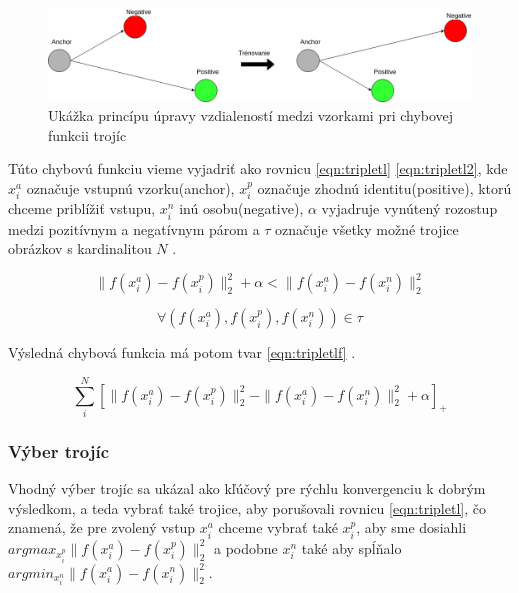 \begin{figure}[H]
	\centering
	\includegraphics[width=0.75\linewidth]{img/triplet}
	\caption{Ukážka princípu úpravy vzdialeností medzi vzorkami pri chybovej funkcii trojíc}
	\label{fig:triplet}
\end{figure}

Túto chybovú funkciu vieme vyjadriť ako rovnicu \eqref{eqn:tripletl} \eqref{eqn:tripletl2}, kde $x_{i}^a$ označuje vstupnú vzorku(anchor), $x_{i}^p$ označuje zhodnú identitu(positive), ktorú chceme priblížiť vstupu,
$x_{i}^n$ inú osobu(negative), $\alpha$ vyjadruje vynútený rozostup medzi pozitívnym a negatívnym párom a $\tau$ označuje všetky možné trojice obrázkov s kardinalitou $ N $ \cite{schroff2015facenet}.

\begin{equation}\label{eqn:tripletl}
\parallel f(x_{i}^a) - f(x_{i}^p) \parallel_{2}^2 + \alpha <
\parallel f(x_{i}^a) - f(x_{i}^n)\parallel_{2}^2
\end{equation}

\begin{equation}\label{eqn:tripletl2}
\forall(f(x_{i}^a), f(x_{i}^p), f(x_{i}^n)) \in \tau
\end{equation}

\indent Výsledná chybová funkcia má potom tvar \eqref{eqn:tripletlf} \cite{schroff2015facenet}.

\begin{equation}\label{eqn:tripletlf}
\sum \limits_{i}^N [
\parallel f(x_{i}^a) - f(x_{i}^p) \parallel_{2}^2 -
\parallel f(x_{i}^a) - f(x_{i}^n) \parallel_{2}^2 + \alpha 
]_{+}
\end{equation} 

\subsubsection{Výber trojíc}
Vhodný výber trojíc sa ukázal ako kľúčový pre rýchlu konvergenciu k dobrým výsledkom, a teda
vybrať také trojice, aby porušovali rovnicu \eqref{eqn:tripletl}, čo znamená, že pre zvolený vstup
$x_{i}^a$ chceme vybrať také $x_{i}^p$, aby sme dosiahli $argmax_{x_{i}^p}\parallel f(x_{i}^a) - f(x_{i}^p) \parallel_{2}^2$ a podobne $x_{i}^n$ také aby spĺňalo $argmin_{x_{i}^n}\parallel f(x_{i}^a) - f(x_{i}^n) \parallel_{2}^2$. 

